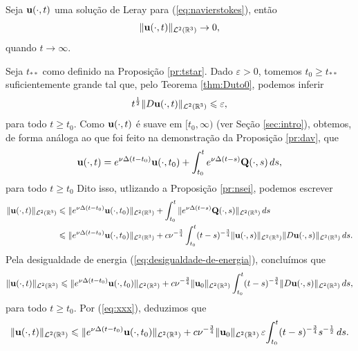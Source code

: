 \begin{tbox} \label{thm:problema-leray}
    Seja $\mathbf{u}(\cdot,t)$ uma solução de Leray para (\ref{eq:navierstokes}), então
    \[
        \Vert \mathbf{u}(\cdot,t) \Vert_{\mathcal{L}^2(\mathbb{R}^3)}\to 0,
    \]
    quando $t \to \infty$.
\end{tbox}
\begin{prf}
    Seja $t_{**}$ como definido na Proposição \ref{pr:tstar}.
    Dado $\varepsilon > 0$, tomemos $t_0 \geqslant t_{**}$ suficientemente grande tal que, pelo Teorema \ref{thm:Duto0}, podemos inferir
    \begin{equation} \label{eq:xxx}
        t^{\frac{1}{2}} \Vert D\mathbf{u}(\cdot,t) \Vert_{\mathcal{L}^2(\mathbb{R}^3)} \leqslant \varepsilon,
    \end{equation}
    para todo $t \geqslant t_0$.
    Como $\mathbf{u}(\cdot,t)$ é suave em $[t_0,\infty)$ (ver Seção \ref{sec:intro}), obtemos, de forma análoga ao que foi feito na demonstração da Proposição \ref{pr:dav}, que
    \begin{equation} \label{eq:2212}
        \mathbf{u}(\cdot,t) = e^{\nu\Delta(t - t_0)} \mathbf{u}(\cdot,t_0) + \int_{t_0}^{t} e^{\nu\Delta(t-s)}\mathbf{Q}(\cdot,s) \, ds,
    \end{equation}
    para todo $t \geqslant t_0$
    Dito isso, utlizando a Proposição \ref{pr:nsei}, podemos escrever
    \[
        \begin{aligned}
            \Vert \mathbf{u}(\cdot,t) \Vert_{\mathcal{L}^2(\mathbb{R}^3)} &\leqslant \Vert e^{\nu\Delta(t - t_0)} \mathbf{u}(\cdot,t_0) \Vert_{\mathcal{L}^2(\mathbb{R}^3)} + \int_{t_0}^t \Vert e^{\nu\Delta(t-s)} \mathbf{Q}(\cdot,s) \Vert_{\mathcal{L}^2(\mathbb{R}^3)}\,ds\\
            &\leqslant \Vert e^{\nu\Delta(t - t_0)} \mathbf{u}(\cdot,t_0) \Vert_{\mathcal{L}^2(\mathbb{R}^3)} + c \nu^{-\frac{3}{4}} \int_{t_0}^t (t - s)^{-\frac{3}{4}} \Vert \mathbf{u}(\cdot,s) \Vert_{\mathcal{L}^2(\mathbb{R}^3)} \Vert D\mathbf{u}(\cdot,s) \Vert_{\mathcal{L}^2(\mathbb{R}^3)} \,ds.
        \end{aligned}
    \]
    Pela desigualdade de energia (\ref{eq:desigualdade-de-energia}), concluímos que
    \[
        \Vert \mathbf{u}(\cdot,t) \Vert_{\mathcal{L}^2(\mathbb{R}^3)} \leqslant\Vert e^{\nu\Delta(t - t_0)} \mathbf{u}(\cdot,t_0) \Vert_{\mathcal{L}^2(\mathbb{R}^3)} + c \nu^{-\frac{3}{4}} \Vert \mathbf{u}_0 \Vert_{\mathcal{L}^2(\mathbb{R}^3)} \int_{t_0}^t (t - s)^{-\frac{3}{4}}\Vert D\mathbf{u}(\cdot,s) \Vert_{\mathcal{L}^2(\mathbb{R}^3)} \,ds,
    \]
    para todo $t \geqslant t_0$.
    Por (\ref{eq:xxx}), deduzimos que
    \[
        \Vert \mathbf{u}(\cdot,t) \Vert_{\mathcal{L}^2(\mathbb{R}^3)} \leqslant \Vert e^{\nu\Delta(t - t_0)} \mathbf{u}(\cdot,t_0) \Vert_{\mathcal{L}^2(\mathbb{R}^3)} + c \nu^{-\frac{3}{4}} \Vert \mathbf{u}_0 \Vert_{\mathcal{L}^2(\mathbb{R}^3)}\, \varepsilon \! \int_{t_0}^t (t - s)^{-\frac{3}{4}} s^{-\frac{1}{2}} \,ds.
\]
\end{prf}
